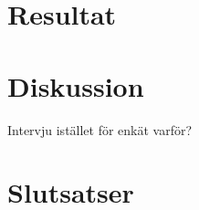 \section{Resultat}
\section{Diskussion}
Intervju istället för enkät varför?
\section{Slutsatser}





